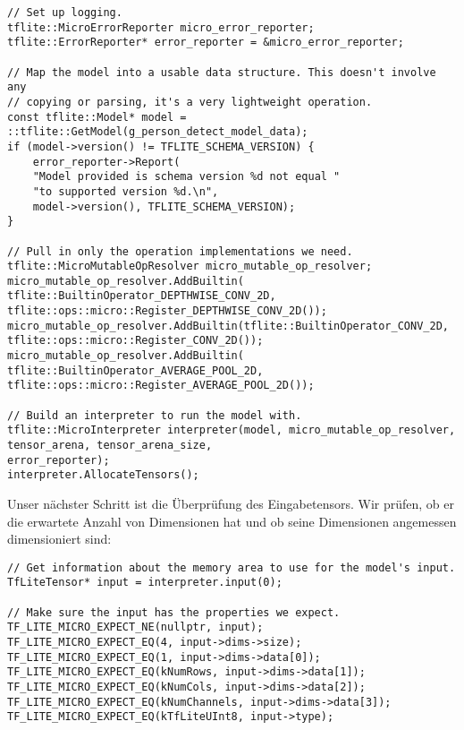 \begin{code}
    \begin{lstlisting}
// Set up logging.
tflite::MicroErrorReporter micro_error_reporter;
tflite::ErrorReporter* error_reporter = &micro_error_reporter;

// Map the model into a usable data structure. This doesn't involve any
// copying or parsing, it's a very lightweight operation.
const tflite::Model* model = ::tflite::GetModel(g_person_detect_model_data);
if (model->version() != TFLITE_SCHEMA_VERSION) {
    error_reporter->Report(
    "Model provided is schema version %d not equal "
    "to supported version %d.\n",
    model->version(), TFLITE_SCHEMA_VERSION);
}

// Pull in only the operation implementations we need.
tflite::MicroMutableOpResolver micro_mutable_op_resolver;
micro_mutable_op_resolver.AddBuiltin(
tflite::BuiltinOperator_DEPTHWISE_CONV_2D,
tflite::ops::micro::Register_DEPTHWISE_CONV_2D());
micro_mutable_op_resolver.AddBuiltin(tflite::BuiltinOperator_CONV_2D,
tflite::ops::micro::Register_CONV_2D());
micro_mutable_op_resolver.AddBuiltin(
tflite::BuiltinOperator_AVERAGE_POOL_2D,
tflite::ops::micro::Register_AVERAGE_POOL_2D());

// Build an interpreter to run the model with.
tflite::MicroInterpreter interpreter(model, micro_mutable_op_resolver,
tensor_arena, tensor_arena_size,
error_reporter);
interpreter.AllocateTensors();
  \end{lstlisting}
\end{code}

Unser nächster Schritt ist die Überprüfung des Eingabetensors. Wir prüfen, ob er die erwartete Anzahl von Dimensionen hat und ob seine Dimensionen angemessen dimensioniert sind:

\begin{code}
    \begin{lstlisting}
// Get information about the memory area to use for the model's input.
TfLiteTensor* input = interpreter.input(0);

// Make sure the input has the properties we expect.
TF_LITE_MICRO_EXPECT_NE(nullptr, input);
TF_LITE_MICRO_EXPECT_EQ(4, input->dims->size);
TF_LITE_MICRO_EXPECT_EQ(1, input->dims->data[0]);
TF_LITE_MICRO_EXPECT_EQ(kNumRows, input->dims->data[1]);
TF_LITE_MICRO_EXPECT_EQ(kNumCols, input->dims->data[2]);
TF_LITE_MICRO_EXPECT_EQ(kNumChannels, input->dims->data[3]);
TF_LITE_MICRO_EXPECT_EQ(kTfLiteUInt8, input->type);
  \end{lstlisting}
\end{code}

